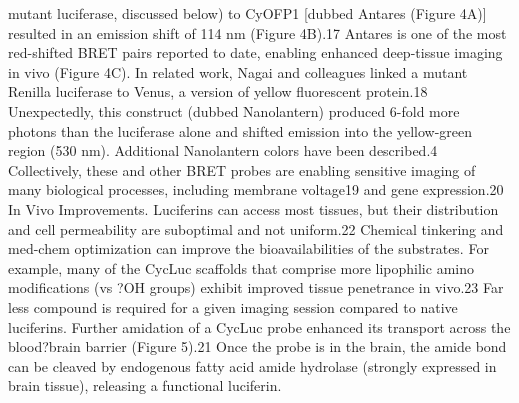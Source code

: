 mutant luciferase, discussed below) to CyOFP1 [dubbed
Antares (Figure 4A)] resulted in an emission shift of 114 nm
(Figure 4B).17 Antares is one of the most red-shifted BRET
pairs reported to date, enabling enhanced deep-tissue imaging
in vivo (Figure 4C). In related work, Nagai and colleagues
linked a mutant Renilla luciferase to Venus, a version of yellow
fluorescent protein.18 Unexpectedly, this construct (dubbed
Nanolantern) produced 6-fold more photons than the
luciferase alone and shifted emission into the yellow-green
region (530 nm). Additional Nanolantern colors have been
described.4 Collectively, these and other BRET probes are
enabling sensitive imaging of many biological processes,
including membrane voltage19 and gene expression.20
In Vivo Improvements. Luciferins can access most tissues,
but their distribution and cell permeability are suboptimal and
not uniform.22 Chemical tinkering and med-chem optimization
can improve the bioavailabilities of the substrates. For example,
many of the CycLuc scaffolds that comprise more lipophilic
amino modifications (vs ?OH groups) exhibit improved tissue
penetrance in vivo.23 Far less compound is required for a given
imaging session compared to native luciferins. Further
amidation of a CycLuc probe enhanced its transport across
the blood?brain barrier (Figure 5).21 Once the probe is in the
brain, the amide bond can be cleaved by endogenous fatty acid
amide hydrolase (strongly expressed in brain tissue), releasing a
functional luciferin.
